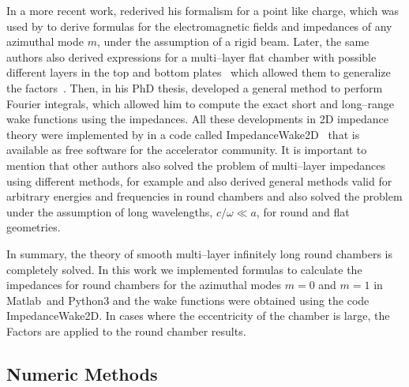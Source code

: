     In a more recent work,  rederived his formalism for a point like charge, which was used by  to derive formulas for the electromagnetic fields and impedances of any azimuthal mode $m$, under the assumption of a rigid beam. Later, the same authors also derived expressions for a multi--layer flat chamber with possible different layers in the top and bottom plates~\cite{Mounet2010a} which allowed them to generalize the \citeauthor{Yokoya1993} factors~\cite{Mounet2010}. Then, in his PhD thesis,  developed a general method to perform Fourier integrals, which allowed him to compute the exact short and long--range wake functions using the impedances. All these developments in 2D impedance theory were implemented by \citeauthor{Mounet2011} in a code called ImpedanceWake2D~\cite{Mounet2011} that is available as free software for the accelerator community.
    It is important to mention that other authors also solved the problem of multi--layer impedances using different methods, for example  and  also derived general methods valid for arbitrary energies and frequencies in round chambers and  also solved the problem under the assumption of long wavelengths, $c/\omega \ll a$, for round and flat geometries.

    In summary, the theory of smooth multi--layer infinitely long round chambers is completely solved. In this work we implemented \citeauthor{Mounet2009} formulas to calculate the impedances for round chambers for the azimuthal modes $m=0$ and $m=1$ in Matlab\textregistered~and Python3 and the wake functions were obtained using the code ImpedanceWake2D. In cases where the eccentricity of the chamber is large, the \citeauthor{Yokoya1993} Factors are applied to the round chamber results.

\subsection{Numeric Methods}\label{ssec:numeric_methods}

